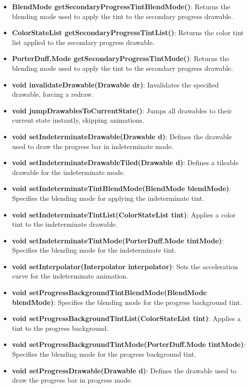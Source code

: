 \documentclass{report}
\begin{document}
\begin{itemize}
\begin{itemize}
        \item \textbf{BlendMode getSecondaryProgressTintBlendMode()}: Returns the blending mode used to apply the tint to the secondary progress drawable.
        \item \textbf{ColorStateList getSecondaryProgressTintList()}: Returns the color tint list applied to the secondary progress drawable.
        \item \textbf{PorterDuff.Mode getSecondaryProgressTintMode()}: Returns the blending mode used to apply the tint to the secondary progress drawable.
        \item \textbf{void invalidateDrawable(Drawable dr)}: Invalidates the specified drawable, forcing a redraw.
        \item \textbf{void jumpDrawablesToCurrentState()}: Jumps all drawables to their current state instantly, skipping animations.
        \item \textbf{void setIndeterminateDrawable(Drawable d)}: Defines the drawable used to draw the progress bar in indeterminate mode.
        \item \textbf{void setIndeterminateDrawableTiled(Drawable d)}: Defines a tileable drawable for the indeterminate mode.
        \item \textbf{void setIndeterminateTintBlendMode(BlendMode blendMode)}: Specifies the blending mode for applying the indeterminate tint.
        \item \textbf{void setIndeterminateTintList(ColorStateList tint)}: Applies a color tint to the indeterminate drawable.
        \item \textbf{void setIndeterminateTintMode(PorterDuff.Mode tintMode)}: Specifies the blending mode for the indeterminate tint.
        \item \textbf{void setInterpolator(Interpolator interpolator)}: Sets the acceleration curve for the indeterminate animation.
        \item \textbf{void setProgressBackgroundTintBlendMode(BlendMode blendMode)}: Specifies the blending mode for the progress background tint.
        \item \textbf{void setProgressBackgroundTintList(ColorStateList tint)}: Applies a tint to the progress background.
        \item \textbf{void setProgressBackgroundTintMode(PorterDuff.Mode tintMode)}: Specifies the blending mode for the progress background tint.
        \item \textbf{void setProgressDrawable(Drawable d)}: Defines the drawable used to draw the progress bar in progress mode.

\end{itemize}
\end{itemize}
\end{document}
